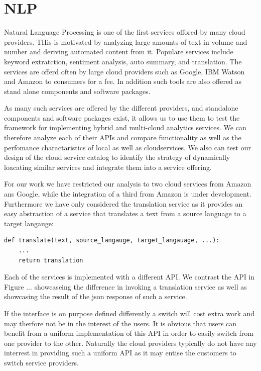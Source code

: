 
\section{NLP}


Natural Language Processing is one of the first services offored by
many cloud providers. THis is motivated by analyzing large amounts of
text in volume and number and deriving automated content from
it. Populare services include keyword extratction, sentiment analysis,
auto summary, and translation.  The services are offerd often by large
cloud providers such as Google, IBM Watson and Amazon to consumers for
a fee. In addition such tools are also offered as stand alone
components and software packages.

As many such services are offered by the different providers, and
standalone components and software packages exist, it allows us to use
them to test the framework for implementing hybrid and multi-cloud
analytics services. We can therefore analyze each of their APIs and
compare functionality as well as the perfomance charactaristics of
local as well as cloudservices. We also can test our design of the
cloud service catalog to identify the strategy of dynamically
loacating similar services and integrate them into a service offering.

For our work we have restricted our analysis to two cloud services
from Amazon ans Google, while the integration of a third from Amazon
is under development. Furthermore we have only considered the
translation service as it provides an easy abstraction of a service
that translates a text from a source language to a target langauge:

\begin{Verbatim}[fontsize=\small]
def translate(text, source_langauge, target_langauage, ...):
    ...
    return translation
\end{Verbatim}

Each of the services is implemented with a different API. We contrast
the API in Figure ... showcaseing the difference in invoking a
translation service as well as showcasing the result of the json
response of such a service.


If the interface is on purpose defined differently a switch will cost
extra work and may therfore not be in the interest of the users.  It
is obvious that users can benefit from a uniform implementation of
this API in order to easily switch from one provider to the other.
Naturally the cloud providers typically do not have any interrest in
providing such a uniform API as it may entise the customers to switch
service providers.

